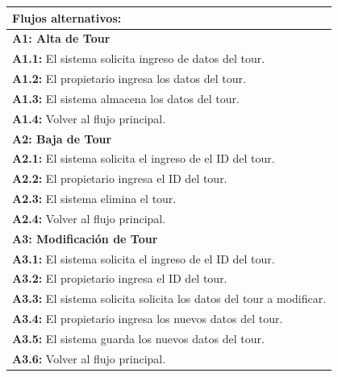 \documentclass[12pt,a4paper,titlepage,oneside]{article}
\begin{document}
\begin{tabular}{| l | p{0.8\linewidth} |}
	\multicolumn{2}{|p{0.8\linewidth}|}{\textbf{Flujos alternativos:}	}\\ 			     \hline
	\multicolumn{2}{|p{0.8\linewidth}|}{\textbf{A1: Alta de Tour}} \\ \hline
	\multicolumn{2}{|p{0.8\linewidth}|}{\textbf{A1.1:} El sistema solicita ingreso de datos del tour.} \\ \hline
	\multicolumn{2}{|p{0.8\linewidth}|}{\textbf{A1.2:} El propietario ingresa los datos del tour.
	} \\ \hline
	\multicolumn{2}{|p{0.8\linewidth}|}{\textbf{A1.3:} El sistema almacena los datos del tour.
	} \\ \hline
	\multicolumn{2}{|p{0.8\linewidth}|}{\textbf{A1.4:} Volver al flujo principal.
	} \\ \hline
		\multicolumn{2}{|p{0.8\linewidth}|}{\textbf{A2: Baja de Tour}} \\ \hline
	\multicolumn{2}{|p{0.8\linewidth}|}{\textbf{A2.1:} El sistema solicita el ingreso de el ID del tour.} \\ \hline
	\multicolumn{2}{|p{0.8\linewidth}|}{\textbf{A2.2:} El propietario ingresa el ID del tour. 
	} \\ \hline
	\multicolumn{2}{|p{0.8\linewidth}|}{\textbf{A2.3:} El sistema elimina el tour.
	} \\ \hline
	\multicolumn{2}{|p{0.8\linewidth}|}{\textbf{A2.4:} Volver al flujo principal.
	} \\ \hline
		\multicolumn{2}{|p{0.8\linewidth}|}{\textbf{A3: Modificación de Tour}} \\ \hline
	\multicolumn{2}{|p{0.8\linewidth}|}{\textbf{A3.1:} El sistema solicita el ingreso de el ID del tour.} \\ \hline
	\multicolumn{2}{|p{0.8\linewidth}|}{\textbf{A3.2:} El propietario ingresa el ID del tour. 
	} \\ \hline
	\multicolumn{2}{|p{0.8\linewidth}|}{\textbf{A3.3:} El sistema solicita solicita los datos del tour a modificar.
	} \\ \hline
	\multicolumn{2}{|p{0.8\linewidth}|}{\textbf{A3.4:} El propietario ingresa los nuevos datos del tour.
	} \\ \hline
		\multicolumn{2}{|p{0.8\linewidth}|}{\textbf{A3.5:} El sistema guarda los nuevos datos del tour.
	} \\ \hline
	\multicolumn{2}{|p{0.8\linewidth}|}{\textbf{A3.6:} Volver al flujo principal.
	} \\ \hline




\end{tabular} \\\\
\\\\\\\\
\end{document}
